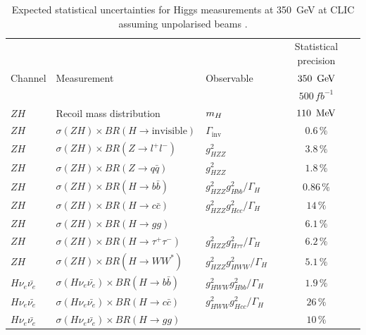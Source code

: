 \begin{table}
  \centering
  \begin{tabular}{lllc}\toprule
     &                                                           &                              & Statistical precision                        \\\cmidrule(l){4-4}
     Channel  & Measurement                                        & Observable            & $350\,\GeV$       \\ 
     &                                                           &                              & $500\,fb^{-1}$        \\ \midrule
     $ZH$            & Recoil mass distribution                                  & $m_H$                        & $110\,\MeV$  \\
     $ZH$            & $\sigma(ZH)\times BR(H\rightarrow \text{invisible})$         & $\Gamma_\text{inv}$          & $0.6\,\%$  \\ \midrule
     $ZH$            & $\sigma(ZH)\times BR(Z\rightarrow l^+l^-)$             & $g^{2}_{HZZ}$                  & $3.8\,\%$  \\
     $ZH$            & $\sigma(ZH)\times BR(Z\rightarrow q\bar{q})$                  & $g^{2}_{HZZ}$                  & $1.8\,\%$  \\
     $ZH$            & $\sigma(ZH)\times BR(H\rightarrow b\bar{b})$                & $g^{2}_{HZZ}g^{2}_{Hbb}/\Gamma_H$     & $0.86\,\%$ \\
     $ZH$            & $\sigma(ZH)\times BR(H\rightarrow c\bar{c})$                & $g^{2}_{HZZ}g^{2}_{Hcc}/\Gamma_H$       & $14\,\%$ \\
     $ZH$            & $\sigma(ZH)\times BR(H\rightarrow gg)$                   &                              & $6.1\,\%$ \\
     $ZH$            & $\sigma(ZH)\times BR(H\rightarrow \tau^+\tau^-)$               & $g^{2}_{HZZ}g^{2}_{H\tau\tau}/\Gamma_H$ & $6.2\,\%$ \\
     $ZH$            & $\sigma(ZH)\times BR(H\rightarrow WW^*)$                 & $g^{2}_{HZZ}g^{2}_{HWW}/\Gamma_H$     & $5.1\,\%$ \\
     $H\nu_e\bar{\nu_e}$    & $\sigma(H\nu_e\bar{\nu_e})\times BR(H\rightarrow b\bar{b})$        & $g^{2}_{HWW}g^{2}_{Hbb}/\Gamma_H$     & $1.9\,\%$ \\
     $H\nu_e\bar{\nu_e}$    & $\sigma(H\nu_e\bar{\nu_e})\times BR(H\rightarrow c\bar{c})$        & $g^{2}_{HWW}g^{2}_{Hcc}/\Gamma_H$     & $26\,\%$ \\
     $H\nu_e\bar{\nu_e}$    & $\sigma(H\nu_e\bar{\nu_e})\times BR(H\rightarrow gg)$        &     & $10\,\%$ \\    
     \bottomrule
   \end{tabular}
   \caption[Expected statistical uncertainties for Higgs measurements at 350~GeV at CLIC assuming unpolarised beams]{Expected statistical uncertainties for Higgs measurements at 350~GeV at CLIC assuming unpolarised beams \cite{Abramowicz:2016zbo}.}
   \label{fig:350GeVNumbers}
\end{table}

